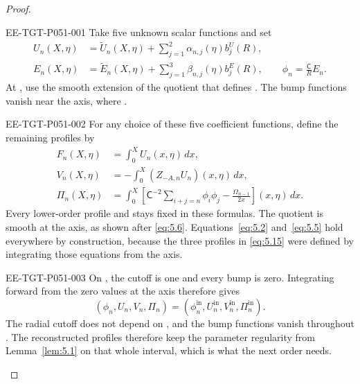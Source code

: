 \begin{proof}
%
\begin{EESegment}{EE-TGT-P051-001}
Take five unknown scalar functions  and set
\begin{equation}\label{eq:5.14}
\begin{aligned}
U_n(X,\eta)&=\widetilde U_n(X,\eta)+\sum_{j=1}^{2}\alpha_{n,j}(\eta)b_j^U(R),\\
E_n(X,\eta)&=\widetilde E_n(X,\eta)+\sum_{j=1}^{3}\beta_{n,j}(\eta)b_j^E(R),
\qquad
\phi_n=\frac{\mathsf C}{R}E_n.
\end{aligned}
\tag{5.14}
\end{equation}
At , use the smooth extension of the quotient that defines
. The bump functions vanish near the axis, where
.
\end{EESegment}

\begin{EESegment}{EE-TGT-P051-002}
For any choice of these five coefficient functions, define the remaining profiles by
\begin{equation}\label{eq:5.15}
\begin{aligned}
F_n(X,\eta)&=\int_0^XU_n(x,\eta)\,dx,\\
V_n(X,\eta)&=-\int_0^X(Z_{-A,n}U_n)(x,\eta)\,dx,\\
\Pi_n(X,\eta)&=\int_0^X\left[\mathsf C^{-2}\sum_{i+j=n}\phi_i\phi_j-\frac{\Omega_{n-1}}{2x}\right](x,\eta)\,dx.
\end{aligned}
\tag{5.15}
\end{equation}
Every lower-order profile and  stays fixed in these formulas. The quotient
 is smooth at the axis, as shown after \eqref{eq:5.6}. Equations~\eqref{eq:5.2}
and~\eqref{eq:5.5} hold everywhere by construction, because the three profiles in \eqref{eq:5.15} were defined by
integrating those equations from the axis.
\end{EESegment}

\begin{EESegment}{EE-TGT-P051-003}
On , the cutoff is one and every bump is zero. Integrating forward from the zero values at
the axis therefore gives
\[
(\phi_n,U_n,V_n,\Pi_n)
=(\phi_n^{\mathrm{in}},U_n^{\mathrm{in}},V_n^{\mathrm{in}},\Pi_n^{\mathrm{in}}).
\]
The radial cutoff does not depend on , and the bump functions vanish throughout
. The reconstructed profiles therefore keep the parameter regularity from
Lemma~\ref{lem:5.1} on that whole interval, which is what the next order needs.
\end{EESegment}


\end{proof}
